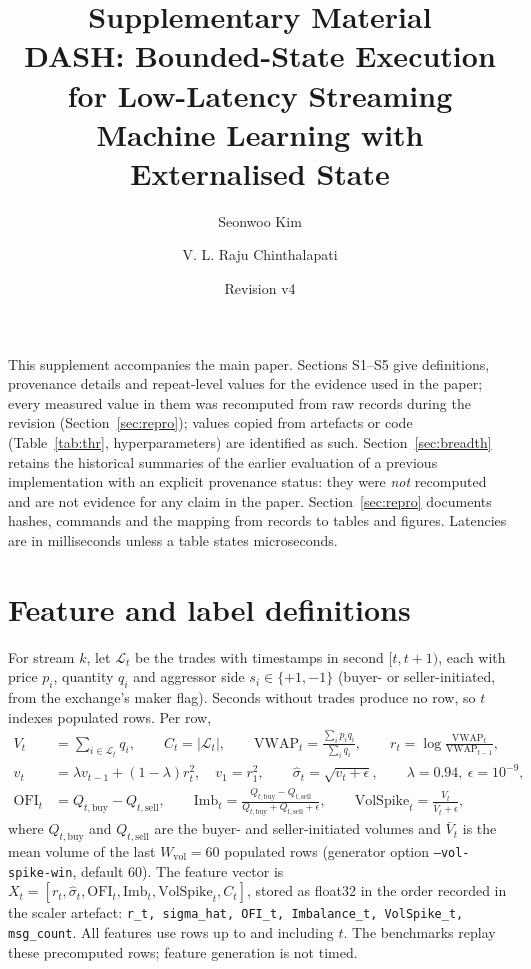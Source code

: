 \documentclass[10pt,a4paper]{article}
\title{Supplementary Material\\[4pt]\large DASH: Bounded-State Execution for Low-Latency Streaming Machine Learning with Externalised State}
\author{Seonwoo Kim \and V. L. Raju Chinthalapati}
\date{Revision v4}
\begin{document}
\maketitle

\noindent This supplement accompanies the main paper. Sections S1--S5 give definitions, provenance details and repeat-level values for the evidence used in the paper; every measured value in them was recomputed from raw records during the revision (Section~\ref{sec:repro}); values copied from artefacts or code (Table~\ref{tab:thr}, hyperparameters) are identified as such. Section~\ref{sec:breadth} retains the historical summaries of the earlier evaluation of a previous implementation with an explicit provenance status: they were \emph{not} recomputed and are not evidence for any claim in the paper. Section~\ref{sec:repro} documents hashes, commands and the mapping from records to tables and figures. Latencies are in milliseconds unless a table states microseconds.

\section{Feature and label definitions}
\label{sec:features}
For stream $k$, let $\mathcal{L}_t$ be the trades with timestamps in second $[t,t+1)$, each with price $p_i$, quantity $q_i$ and aggressor side $s_i\in\{+1,-1\}$ (buyer- or seller-initiated, from the exchange's maker flag). Seconds without trades produce no row, so $t$ indexes populated rows. Per row,
\begin{align}
V_t &= \textstyle\sum_{i\in\mathcal{L}_t} q_i, \qquad C_t=|\mathcal{L}_t|, \qquad \mathrm{VWAP}_t=\frac{\sum_{i} p_i q_i}{\sum_i q_i},\qquad r_t=\log\frac{\mathrm{VWAP}_t}{\mathrm{VWAP}_{t-1}},\\
v_t &= \lambda v_{t-1}+(1-\lambda)r_t^2,\quad v_1=r_1^2,\qquad \hat\sigma_t=\sqrt{v_t+\epsilon},\qquad \lambda=0.94,\ \epsilon=10^{-9},\\
\mathrm{OFI}_t &= Q_{t,\mathrm{buy}}-Q_{t,\mathrm{sell}},\qquad \mathrm{Imb}_t=\frac{Q_{t,\mathrm{buy}}-Q_{t,\mathrm{sell}}}{Q_{t,\mathrm{buy}}+Q_{t,\mathrm{sell}}+\epsilon},\qquad \mathrm{VolSpike}_t=\frac{V_t}{\bar V_t+\epsilon},
\end{align}
where $Q_{t,\mathrm{buy}}$ and $Q_{t,\mathrm{sell}}$ are the buyer- and seller-initiated volumes and $\bar V_t$ is the mean volume of the last $W_{\mathrm{vol}}=60$ populated rows (generator option \texttt{--vol-spike-win}, default 60). The feature vector is $X_t=[r_t,\hat\sigma_t,\mathrm{OFI}_t,\mathrm{Imb}_t,\mathrm{VolSpike}_t,C_t]$, stored as float32 in the order recorded in the scaler artefact: \texttt{r\_t, sigma\_hat, OFI\_t, Imbalance\_t, VolSpike\_t, msg\_count}. All features use rows up to and including $t$. The benchmarks replay these precomputed rows; feature generation is not timed.
\end{document}
